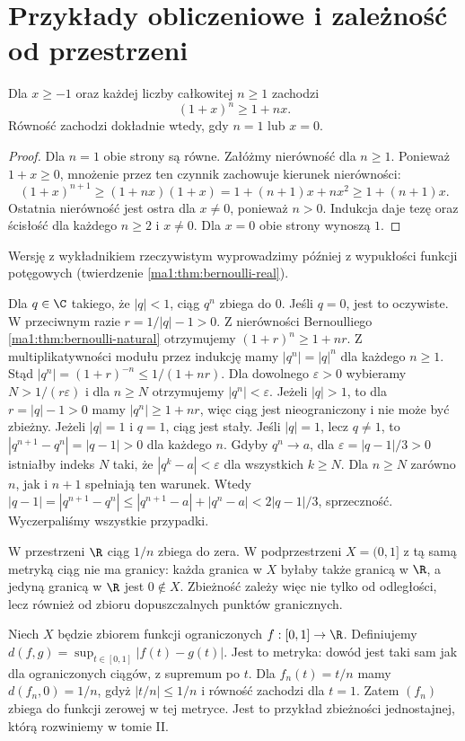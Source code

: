\section{Przykłady obliczeniowe i zależność od przestrzeni}
\begin{twierdzenie}
\label{ma1:thm:bernoulli-natural}
Dla $x\ge-1$ oraz każdej liczby całkowitej $n\ge1$ zachodzi
\[
 (1+x)^n\ge1+nx.
\]
Równość zachodzi dokładnie wtedy, gdy $n=1$ lub $x=0$.
\end{twierdzenie}
\begin{proof}
Dla $n=1$ obie strony są równe. Załóżmy nierówność dla $n\ge1$. Ponieważ $1+x\ge0$, mnożenie przez ten czynnik zachowuje kierunek nierówności:
\[
 (1+x)^{n+1}\ge(1+nx)(1+x)
 =1+(n+1)x+nx^2\ge1+(n+1)x.
\]
Ostatnia nierówność jest ostra dla $x\ne0$, ponieważ $n>0$. Indukcja daje tezę oraz ścisłość dla każdego $n\ge2$ i $x\ne0$. Dla $x=0$ obie strony wynoszą $1$.
\end{proof}
Wersję z wykładnikiem rzeczywistym wyprowadzimy później z wypukłości funkcji potęgowych (twierdzenie \ref{ma1:thm:bernoulli-real}).
\begin{przyklad}
\label{ma1:ex:geometric-sequence}
Dla $q\in\C$ takiego, że $|q|<1$, ciąg $q^n$ zbiega do $0$. Jeśli $q=0$, jest to oczywiste. W przeciwnym razie $r=1/|q|-1>0$. Z nierówności Bernoulliego \ref{ma1:thm:bernoulli-natural} otrzymujemy $(1+r)^n\ge 1+nr$.
Z multiplikatywności modułu przez indukcję mamy $|q^n|=|q|^n$ dla każdego $n\ge1$. Stąd $|q^n|=(1+r)^{-n}\le 1/(1+nr)$. Dla dowolnego $\varepsilon>0$ wybieramy $N>1/(r\varepsilon)$ i dla $n\ge N$ otrzymujemy $|q^n|<\varepsilon$.
Jeżeli $|q|>1$, to dla $r=|q|-1>0$ mamy $|q^n|\ge1+nr$, więc ciąg jest nieograniczony i nie może być zbieżny.
Jeżeli $|q|=1$ i $q=1$, ciąg jest stały. Jeśli $|q|=1$, lecz $q\ne1$, to $|q^{n+1}-q^n|=|q-1|>0$ dla każdego $n$. Gdyby $q^n\to a$, dla $\varepsilon=|q-1|/3>0$ istniałby indeks $N$ taki, że $|q^k-a|<\varepsilon$ dla wszystkich $k\ge N$. Dla $n\ge N$ zarówno $n$, jak i $n+1$ spełniają ten warunek. Wtedy $|q-1|=|q^{n+1}-q^n|\le |q^{n+1}-a|+|q^n-a|<2|q-1|/3$, sprzeczność. Wyczerpaliśmy wszystkie przypadki.
\end{przyklad}
\begin{przyklad}
W przestrzeni $\R$ ciąg $1/n$ zbiega do zera. W podprzestrzeni $X=(0,1]$ z tą samą metryką ciąg nie ma granicy: każda granica w $X$ byłaby także granicą w $\R$, a jedyną granicą w $\R$ jest $0\notin X$. Zbieżność zależy więc nie tylko od odległości, lecz również od zbioru dopuszczalnych punktów granicznych.
\end{przyklad}
\begin{przyklad}
Niech $X$ będzie zbiorem funkcji ograniczonych $f:[0,1]\to\R$. Definiujemy $d(f,g)=\sup_{t\in[0,1]}|f(t)-g(t)|$. Jest to metryka: dowód jest taki sam jak dla ograniczonych ciągów, z supremum po $t$. Dla $f_n(t)=t/n$ mamy $d(f_n,0)=1/n$, gdyż $|t/n|\le1/n$ i równość zachodzi dla $t=1$. Zatem $(f_n)$ zbiega do funkcji zerowej w tej metryce. Jest to przykład zbieżności jednostajnej, którą rozwiniemy w tomie II.
\end{przyklad}

